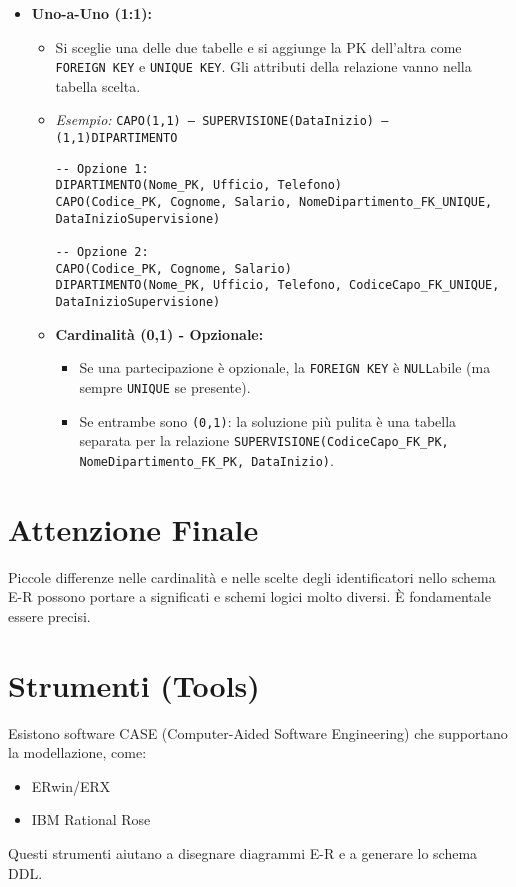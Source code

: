 \begin{itemize}
\begin{itemize}
			\item \textbf{Uno-a-Uno (1:1):}
			\begin{itemize}
				\item Si sceglie una delle due tabelle e si aggiunge la PK dell'altra come \texttt{FOREIGN KEY} e \texttt{UNIQUE KEY}. Gli attributi della relazione vanno nella tabella scelta.
				\item \textit{Esempio:} \texttt{CAPO(1,1) --- SUPERVISIONE(DataInizio) --- (1,1)DIPARTIMENTO}
				\begin{verbatim}
-- Opzione 1:
DIPARTIMENTO(Nome_PK, Ufficio, Telefono)
CAPO(Codice_PK, Cognome, Salario, NomeDipartimento_FK_UNIQUE, DataInizioSupervisione)

-- Opzione 2:
CAPO(Codice_PK, Cognome, Salario)
DIPARTIMENTO(Nome_PK, Ufficio, Telefono, CodiceCapo_FK_UNIQUE, DataInizioSupervisione)
				\end{verbatim}
				\item \textbf{Cardinalità (0,1) - Opzionale:}
				\begin{itemize}
					\item Se una partecipazione è opzionale, la \texttt{FOREIGN KEY} è \texttt{NULL}abile (ma sempre \texttt{UNIQUE} se presente).
					\item Se entrambe sono \texttt{(0,1)}: la soluzione più pulita è una tabella separata per la relazione \texttt{SUPERVISIONE(CodiceCapo\_FK\_PK, NomeDipartimento\_FK\_PK, DataInizio)}.
				\end{itemize}
			\end{itemize}
		\end{itemize}
	\end{itemize}
	
	\section{Attenzione Finale}
	Piccole differenze nelle cardinalità e nelle scelte degli identificatori nello schema E-R possono portare a significati e schemi logici molto diversi. È fondamentale essere precisi.
	
	\section{Strumenti (Tools)}
	Esistono software CASE (Computer-Aided Software Engineering) che supportano la modellazione, come:
	\begin{itemize}
		\item ERwin/ERX
		\item IBM Rational Rose
	\end{itemize}
	Questi strumenti aiutano a disegnare diagrammi E-R e a generare lo schema DDL.
	

